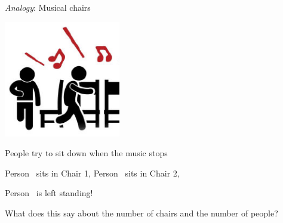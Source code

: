
{\it Analogy}: Musical chairs

\begin{multicols}{2}
\includegraphics[width=2in]{../../resources/images/musicalchairs.png}
\columnbreak

People try to sit down when the music stops

Person\sun~ sits in Chair 1,
Person\smiley~ sits in Chair 2,

Person\frownie~  is left standing!
\end{multicols}
What does this say about the number of chairs and the number of people?